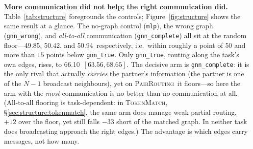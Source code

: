 \documentclass[manuscript, screen, review]{jair}
\newcommand{\gtrue}{\texttt{gnn\_true}}
\newcommand{\gwrong}{\texttt{gnn\_wrong}}
\newcommand{\gcomplete}{\texttt{gnn\_complete}}
\newcommand{\mlpc}{\texttt{mlp}}
\newcommand{\pairrouting}{\textsc{PairRouting}}
\newcommand{\SCfloor}{50}             %
\newcommand{\SCtrueN}{66.10}          %
\newcommand{\SCtrueLo}{63.56}
\newcommand{\SCtrueHi}{68.65}
\newcommand{\SCwrong}{50.42}          %
\newcommand{\SCcomplete}{50.94}       %
\newcommand{\SCmlp}{49.85}            %
\newcommand{\tokenmatch}{\textsc{TokenMatch}}
\begin{document}
\textbf{More communication did not help; the right communication did.}
Table~\ref{tab:structure} foregrounds the controls; Figure~\ref{fig:structure}
shows the same result at a glance.
The no-graph control (\mlpc), the wrong graph (\gwrong), and
\emph{all-to-all} communication (\gcomplete) all sit at the random
floor---\SCmlp, \SCwrong, and \SCcomplete\ respectively, i.e.\ within roughly
a point of $\SCfloor$ and more than $15$ points below \gtrue. Only \gtrue,
routing along the task's own edges, rises, to \SCtrueN\ $[\SCtrueLo,
\SCtrueHi]$. The decisive arm is \gcomplete: it is the only rival that
actually \emph{carries} the partner's information (the partner is one of the
$N{-}1$ broadcast neighbours), yet on \pairrouting\ it floors---so here the arm
with the \emph{most} communication is no better than no communication at all.
(All-to-all flooring is task-dependent: in \tokenmatch,
\S\ref{sec:structure:tokenmatch}, the same arm does manage weak partial routing,
$+12$ over the floor, yet still falls $-33$ short of the matched graph. In
neither task does broadcasting approach the right edges.) The advantage is which
edges carry messages, not how many.
\end{document}
